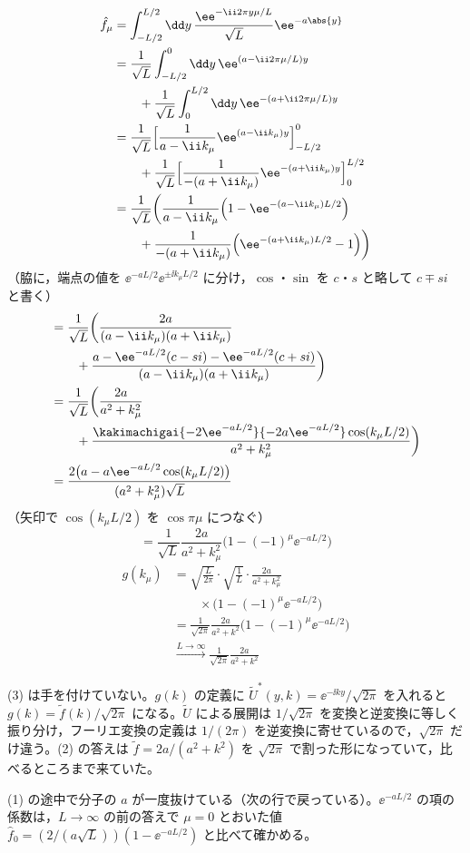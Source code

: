 \begin{align*}
  \hat f_\mu&=\int_{-L/2}^{L/2}\dd y\,\frac{\ee^{-\ii2\pi y\mu/L}}{\sqrt L}\ee^{-a\abs{y}}\\
  &=\frac{1}{\sqrt L}\int_{-L/2}^{0}\dd y\,\ee^{(a-\ii2\pi\mu/L)y}\\
  &\qquad+\frac{1}{\sqrt L}\int_{0}^{L/2}\dd y\,\ee^{-(a+\ii2\pi\mu/L)y}\\
  &=\frac{1}{\sqrt L}\Bigl[\frac{1}{a-\ii k_\mu}\ee^{(a-\ii k_\mu)y}\Bigr]_{-L/2}^{0}\\
  &\qquad+\frac{1}{\sqrt L}\Bigl[\frac{1}{-(a+\ii k_\mu)}\ee^{-(a+\ii k_\mu)y}\Bigr]_{0}^{L/2}\\
  &=\frac{1}{\sqrt L}\biggl(\frac{1}{a-\ii k_\mu}\Bigl(1-\ee^{-(a-\ii k_\mu)L/2}\Bigr)\\
  &\qquad+\frac{1}{-(a+\ii k_\mu)}\Bigl(\ee^{-(a+\ii k_\mu)L/2}-1\Bigr)\biggr)
\end{align*}
（脇に，端点の値を $\ee^{-aL/2}\ee^{\pm\ii k_\mu L/2}$ に分け，$\cos$・$\sin$ を $c$・$s$ と略して $c\mp si$ と書く）
\begin{align*}
  &=\frac{1}{\sqrt L}\biggl(\frac{2a}{(a-\ii k_\mu)(a+\ii k_\mu)}\\
  &\qquad+\frac{a-\ee^{-aL/2}(c-si)-\ee^{-aL/2}(c+si)}{(a-\ii k_\mu)(a+\ii k_\mu)}\biggr)\\
  &=\frac{1}{\sqrt L}\biggl(\frac{2a}{a^{2}+k_\mu^{2}}\\
  &\qquad+\frac{\kakimachigai{-2\ee^{-aL/2}}{-2a\ee^{-aL/2}}\cos(k_\mu L/2)}{a^{2}+k_\mu^{2}}\biggr)\\
  &=\frac{2\bigl(a-a\ee^{-aL/2}\cos(k_\mu L/2)\bigr)}{(a^{2}+k_\mu^{2})\sqrt L}
\end{align*}
（矢印で $\cos(k_\mu L/2)$ を $\cos\pi\mu$ につなぐ）
\[ =\frac{1}{\sqrt L}\frac{2a}{a^{2}+k_\mu^{2}}\bigl(1-(-1)^{\mu}\ee^{-aL/2}\bigr) \]
\begin{align*}
  g(k_\mu)&=\sqrt{\frac{L}{2\pi}}\cdot\sqrt{\frac{1}{L}}\cdot\frac{2a}{a^{2}+k_\mu^{2}}\\
  &\qquad\times\bigl(1-(-1)^{\mu}\ee^{-aL/2}\bigr)\\
  &=\frac{1}{\sqrt{2\pi}}\frac{2a}{a^{2}+k^{2}}\bigl(1-(-1)^{\mu}\ee^{-aL/2}\bigr)\\
  &\xrightarrow{L\to\infty}\frac{1}{\sqrt{2\pi}}\frac{2a}{a^{2}+k^{2}}
\end{align*}
\mikai
\item (3) は手を付けていない。$g(k)$ の定義に $\tilde U^{*}(y,k)=\ee^{-\ii ky}/\sqrt{2\pi}$ を入れると $g(k)=\tilde f(k)/\sqrt{2\pi}$ になる。$\tilde U$ による展開は $1/\sqrt{2\pi}$ を変換と逆変換に等しく振り分け，フーリエ変換の定義は $1/(2\pi)$ を逆変換に寄せているので，$\sqrt{2\pi}$ だけ違う。(2) の答えは $\tilde f=2a/(a^{2}+k^{2})$ を $\sqrt{2\pi}$ で割った形になっていて，比べるところまで来ていた。
\item (1) の途中で分子の $a$ が一度抜けている（次の行で戻っている）。$\ee^{-aL/2}$ の項の係数は，$L\to\infty$ の前の答えで $\mu=0$ とおいた値 $\hat f_0=(2/(a\sqrt L))(1-\ee^{-aL/2})$ と比べて確かめる。
